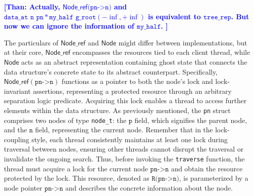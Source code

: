 \documentclass[a4paper,UKenglish,cleveref, autoref, thm-restate]{lipics-v2021}
\newcommand{\treerep}{\ensuremath{\mathsf{Node}}}
\newcommand{\nodeboxrep}{\ensuremath{\mathsf{Node\_ref}}}
\newcommand{\lockinv}{\ensuremath{\mathsf{lock\_inv}}}
\newcommand{\than}[1]{\textbf{\textcolor{blue}{[Than: #1]}}}
\begin{document}
\than{Actually, $\nodeboxrep \texttt{(pn->n)}$ and $\texttt{data\_at  n pn} \ast \texttt{my\_half g\_root} (-\inf, +\inf)$ is equivalent to $\texttt{tree\_rep}$. But now we can ignore the information of $\texttt{my\_half}$.  }


The particulars of $\nodeboxrep$ and $\treerep$ might differ between implementations, but at their core, $\nodeboxrep$ encompasses the resources tied to each client thread, while $\treerep$ acts as an abstract representation containing ghost state that connects the data structure's concrete state to its abstract counterpart. Specifically, $\nodeboxrep(\texttt{pn->n})$ functions as a pointer to both the node's lock and lock-invariant assertions, representing a protected resource through an arbitrary separation logic predicate. Acquiring this lock enables a thread to access further elements within the data structure. 
As previously mentioned, the \lstinline{pn} struct comprises two nodes of type \lstinline{node_t}: the $\texttt{p}$ field, which signifies the parent node, and the $\texttt{n}$ field, representing the current node. Remember that in the lock-coupling style, each thread consistently maintains at least one lock during traversal between nodes, ensuring other threads cannot disrupt the traversal or invalidate the ongoing search. Thus, before invoking the \texttt{traverse} function, the thread must acquire a lock for the current node $\texttt{pn->n}$ and obtain the resource protected by the lock. This resource, denoted as $\texttt{R(pn->n)}$, is parameterized by a node pointer $\texttt{pn->n}$ and describes the concrete information about the node.


\end{document}
